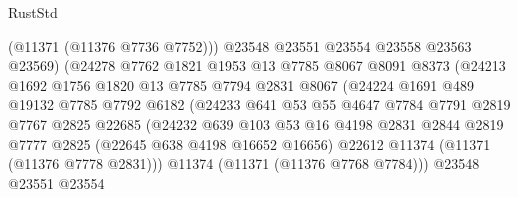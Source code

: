 \begin{lexlean}{RustStd}
\begin{coremodule}
                                (@11371 (@11376 @7736 @7752)))
                              @23548
                              @23551
                              @23554
                              @23558
                              @23563
                              @23569)
                            (@24278
                              @7762
                              @1821
                              @1953
                              @13
                              @7785
                              @8067
                              @8091
                              @8373
                              (@24213
                                @1692
                                @1756
                                @1820
                                @13
                                @7785
                                @7794
                                @2831
                                @8067
                                (@24224
                                  @1691
                                  @489
                                  @19132
                                  @7785
                                  @7792
                                  @6182
                                  (@24233
                                    @641
                                    @53
                                    @55
                                    @4647
                                    @7784
                                    @7791
                                    @2819
                                    @7767
                                    @2825
                                    @22685
                                    (@24232
                                      @639
                                      @103
                                      @53
                                      @16
                                      @4198
                                      @2831
                                      @2844
                                      @2819
                                      @7777
                                      @2825
                                      (@22645 @638 @4198 @16652 @16656)
                                      @22612
                                      @11374
                                      (@11371 (@11376 @7778 @2831)))
                                    @11374
                                    (@11371 (@11376 @7768 @7784)))
                                  @23548
                                  @23551
                                  @23554

\end{coremodule}
\end{lexlean}
